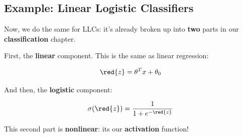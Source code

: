     \subsection*{Example: Linear Logistic Classifiers}
    
        Now, we do the same for LLCs: it's already broken up into \textbf{two} parts in our \textbf{classification} chapter.
        
        First, the \textbf{linear} component. This is the same as linear regression:
        
        \begin{equation}
            \red{z} = 
            \theta^T x + \theta_0
        \end{equation}
        
        And then, the \textbf{logistic} component:
        
        \begin{equation}
            \sigma(\red{z}) = \frac{1}{1+e^{-\red{z}}}
        \end{equation}
        
        This second part is \textbf{nonlinear}: its our \textbf{activation} function!\\
        
